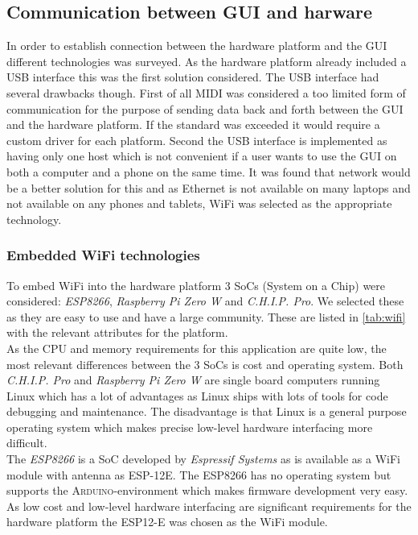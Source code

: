 \subsection{Communication between GUI and harware}
\label{sec:conn_with_GUI}
In order to establish connection between the hardware platform and the GUI different technologies was surveyed. As the hardware platform already included a USB interface this was the first solution considered. The USB interface had several drawbacks though. First of all MIDI was considered a too limited form of communication for the purpose of sending data back and forth between the GUI and the hardware platform. If the standard was exceeded it would require a custom driver for each platform. Second the USB interface is implemented as having only one host which is not convenient if a user wants to use the GUI on both a computer and a phone on the same time. It was found that network would be a better solution for this and as Ethernet is not available on many laptops and not available on any phones and tablets,  WiFi was selected as the appropriate technology.

\subsubsection{Embedded WiFi technologies}

To embed WiFi into the hardware platform 3 SoCs (System on a Chip) were considered: \textit{ESP8266}, \textit{Raspberry Pi Zero W} and \textit{C.H.I.P. Pro}. We selected these as they are easy to use and have a large community. These are listed in \cref{tab:wifi} with the relevant attributes for the platform.\\
As the CPU and memory requirements for this application are quite low, the most relevant differences between the 3 SoCs is cost and operating system. Both \textit{C.H.I.P. Pro} and \textit{Raspberry Pi Zero W} are single board computers running Linux which has a lot of advantages as Linux ships with lots of tools for code debugging and maintenance. The disadvantage is that Linux is a general purpose operating system which makes precise low-level hardware interfacing more difficult.\\
The \textit{ESP8266} is a SoC developed by \textit{Espressif Systems} as is available as a WiFi module with antenna as \textsc{ESP-12E}. The ESP8266 has no operating system but supports the \textsc{Arduino}-environment which makes firmware development very easy. As low cost and low-level hardware interfacing are significant requirements for the hardware platform the ESP12-E was chosen as the WiFi module.

